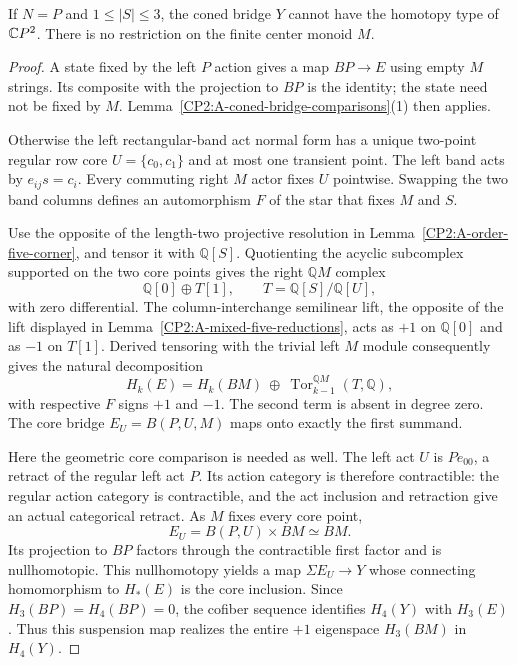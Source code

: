 \begin{proposition}
\label{CP2:A-coned-three-target-P5}
If $N=P$ and $1\leq |S|\leq3$, the coned bridge $Y$ cannot
have the homotopy type of $\mathbb{C}P^2$. There is no restriction on
the finite center monoid $M$.
\end{proposition}
\begin{proof}
A state fixed by the left $P$ action gives a map $BP\to E$
using empty $M$ strings. Its composite with the projection
to $BP$ is the identity; the state need not be fixed by $M$.
Lemma~\ref{CP2:A-coned-bridge-comparisons}(1) then applies.

Otherwise the left rectangular-band act normal form has
a unique two-point regular row core $U=\{c_0,c_1\}$ and at
most one transient point. The left band acts by
$e_{ij}s=c_i$. Every commuting right $M$ actor fixes $U$
pointwise. Swapping the two band columns defines an
automorphism $F$ of the star that fixes $M$ and $S$.

Use the opposite of the length-two projective resolution
in Lemma~\ref{CP2:A-order-five-corner}, and tensor it with
$\mathbb Q[S]$. Quotienting the acyclic subcomplex supported
on the two core points gives the right $\mathbb QM$ complex
\[
 \mathbb Q[0]\oplus T[1],\qquad T=\mathbb Q[S]/\mathbb Q[U],
\]
with zero differential. The column-interchange semilinear
lift, the opposite of the lift displayed in
Lemma~\ref{CP2:A-mixed-five-reductions}, acts as $+1$ on
$\mathbb Q[0]$ and as $-1$ on $T[1]$. Derived tensoring with
the trivial left $M$ module consequently gives the natural
decomposition
\[
 H_k(E)=H_k(BM)\ \oplus\
 \operatorname{Tor}^{\mathbb QM}_{k-1}(T,\mathbb Q),
\]
with respective $F$ signs $+1$ and $-1$. The second term is
absent in degree zero. The core bridge $E_U=B(P,U,M)$ maps
onto exactly the first summand.

Here the geometric core comparison is needed as well.
The left act $U$ is $Pe_{00}$, a retract of the regular left
act $P$. Its action category is therefore contractible: the
regular action category is contractible, and the act inclusion
and retraction give an actual categorical retract. As $M$
fixes every core point,
\[
 E_U=B(P,U)\times BM\simeq BM.
\]
Its projection to $BP$ factors through the contractible
first factor and is nullhomotopic. This nullhomotopy yields
a map $\Sigma E_U\to Y$ whose connecting homomorphism to
$H_*(E)$ is the core inclusion. Since $H_3(BP)=H_4(BP)=0$,
the cofiber sequence identifies $H_4(Y)$ with $H_3(E)$.
Thus this suspension map realizes the entire $+1$
eigenspace $H_3(BM)$ in $H_4(Y)$.


\end{proof}

